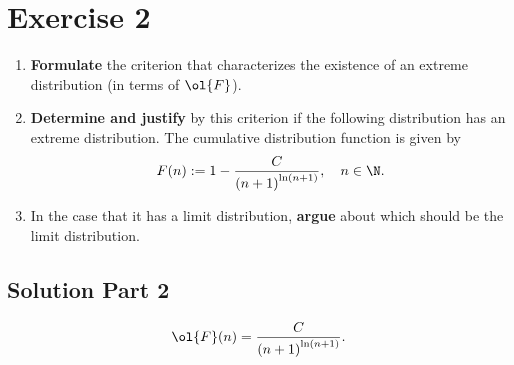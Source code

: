 \section{Exercise 2}

\begin{enumerate}
    \item \textbf{Formulate} the criterion that characterizes the existence of an extreme distribution (in terms of $\ol{F}$).
    \item \textbf{Determine and justify} by this criterion if the following distribution has an extreme distribution. The cumulative distribution function is given by
    \[  F(n) := 1-\frac{C}{{(n+1)}^{\ln (n+1)}} ,\hspace*{1em} n\in\N.\]
    \item In the case that it has a limit distribution, \textbf{argue} about which should be the limit distribution.
\end{enumerate}


\subsection*{Solution Part 2}

\[ \ol{F}(n) = \frac{C}{{(n+1)}^{\ln(n+1)}}. \]

